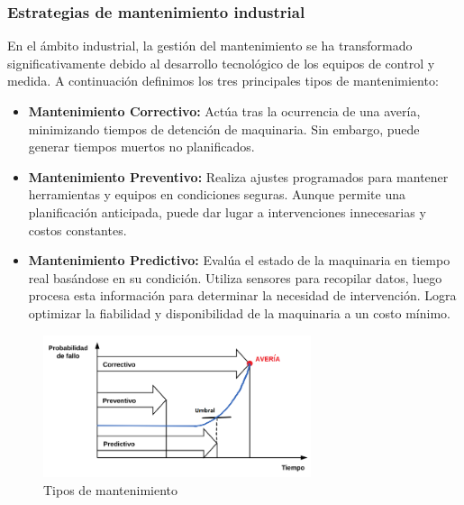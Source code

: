 \documentclass{article}[14pts]
\begin{document}
    \subsubsection{Estrategias de mantenimiento industrial}

    En el ámbito industrial, la gestión del mantenimiento se ha transformado significativamente debido al desarrollo tecnológico de los equipos de control y medida. A continuación definimos los tres principales tipos de mantenimiento:

    \begin{itemize}

        \item \textbf{Mantenimiento Correctivo:} Actúa tras la ocurrencia de una avería, minimizando tiempos de 
        detención de maquinaria. Sin embargo, puede generar tiempos muertos no planificados.

        \item \textbf{Mantenimiento Preventivo:} Realiza ajustes programados para mantener herramientas y equipos en condiciones seguras. Aunque permite una planificación anticipada, puede dar lugar a intervenciones 
        innecesarias y costos constantes.

        \item \textbf{Mantenimiento Predictivo:} Evalúa el estado de la maquinaria en tiempo real basándose en su 
        condición. Utiliza sensores para recopilar datos, luego procesa esta información para determinar la necesidad de intervención. Logra optimizar la fiabilidad y disponibilidad de la maquinaria a un costo mínimo.
        
    \end{itemize}

      \begin{center}
        \begin{figure}[h]
          \centering
          \includegraphics[width=0.7\textwidth]{images/mantenimiento.png}
          \caption{Tipos de mantenimiento}
        \end{figure}    
      \end{center}
      
\end{document}
